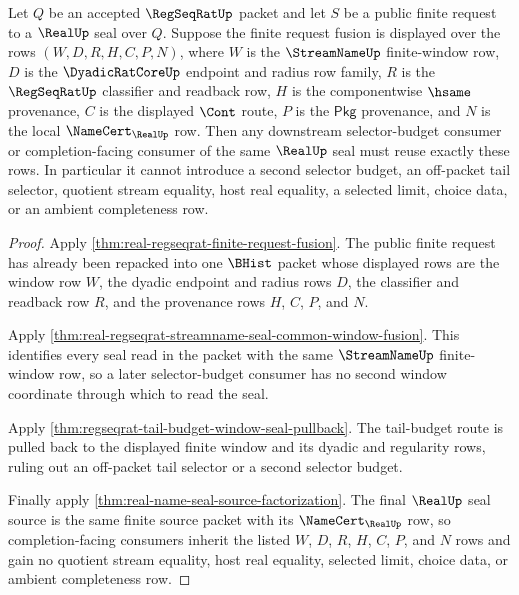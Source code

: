 \begin{theorem}
\label{thm:real-regseqrat-finite-request-fusion-selector-budget-lock}
Let $Q$ be an accepted $\RegSeqRatUp$ packet and let $S$ be a public finite request to a $\RealUp$ seal over $Q$. Suppose the finite request fusion is displayed over the rows $(W,D,R,H,C,P,N)$, where $W$ is the $\StreamNameUp$ finite-window row, $D$ is the $\DyadicRatCoreUp$ endpoint and radius row family, $R$ is the $\RegSeqRatUp$ classifier and readback row, $H$ is the componentwise $\hsame$ provenance, $C$ is the displayed $\Cont$ route, $P$ is the $\mathsf{Pkg}$ provenance, and $N$ is the local $\NameCert_{\RealUp}$ row. Then any downstream selector-budget consumer or completion-facing consumer of the same $\RealUp$ seal must reuse exactly these rows. In particular it cannot introduce a second selector budget, an off-packet tail selector, quotient stream equality, host real equality, a selected limit, choice data, or an ambient completeness row.
\end{theorem}
\begin{proof}
Apply \autoref{thm:real-regseqrat-finite-request-fusion}. The public finite request has already been repacked into one $\BHist$ packet whose displayed rows are the window row $W$, the dyadic endpoint and radius rows $D$, the classifier and readback row $R$, and the provenance rows $H$, $C$, $P$, and $N$.

Apply \autoref{thm:real-regseqrat-streamname-seal-common-window-fusion}. This identifies every seal read in the packet with the same $\StreamNameUp$ finite-window row, so a later selector-budget consumer has no second window coordinate through which to read the seal.

Apply \autoref{thm:regseqrat-tail-budget-window-seal-pullback}. The tail-budget route is pulled back to the displayed finite window and its dyadic and regularity rows, ruling out an off-packet tail selector or a second selector budget.

Finally apply \autoref{thm:real-name-seal-source-factorization}. The final $\RealUp$ seal source is the same finite source packet with its $\NameCert_{\RealUp}$ row, so completion-facing consumers inherit the listed $W$, $D$, $R$, $H$, $C$, $P$, and $N$ rows and gain no quotient stream equality, host real equality, selected limit, choice data, or ambient completeness row.
\end{proof}

